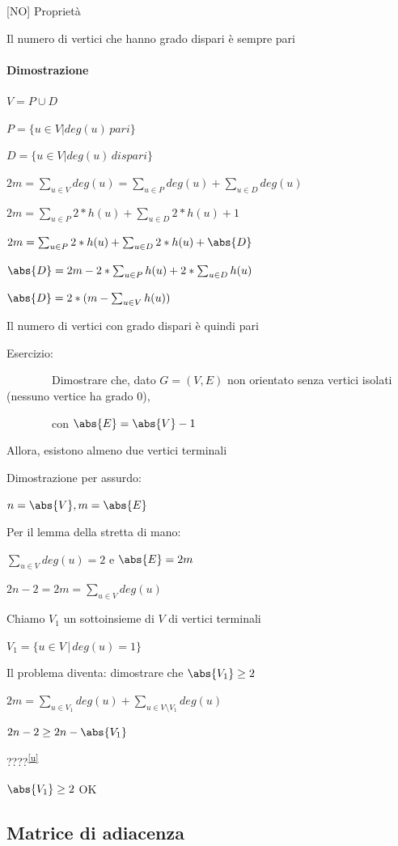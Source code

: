 \documentclass[tikz]{article}
\let\oldparagraph\paragraph
\renewcommand{\paragraph}[1]{\oldparagraph{#1}\mbox{}}
\begin{document}
{{[}NO{]} Proprietà}

{Il numero di vertici che hanno grado dispari è sempre pari}

\paragraph{Dimostrazione}

$V=P\cup D$

$P = \{u \in V | deg(u) \, pari\}$

$D = \{u \in V | deg(u) \, dispari\}$

$2m = \sum_{u \in V}{deg(u)} = \sum_{u \in P}{deg(u)} + \sum_{u \in D}{deg(u)}$

$2m = \sum_{u \in P}{2*h(u)} + \sum_{u \in D}{2*h(u)+1}$

$2m = \sum_{u \in P}{2*h(u)} + \sum_{u \in D}{2*h(u)} + \abs{D}$

$\abs{D} = 2m - 2 *\sum_{u \in P}{h(u)} + 2*\sum_{u \in D}{h(u)}$

$\abs{D} = 2*(m-\sum_{u \in V}{h(u)})$

{Il numero di vertici con grado dispari è quindi pari}

{Esercizio: }

{~~~~~~~~Dimostrare che, dato $G=(V,E)$ non orientato senza vertici isolati (nessuno vertice ha grado 0),}

{~~~~~~~~con $\abs{E} = \abs{V} -1$}

{Allora, esistono almeno due vertici terminali}

{Dimostrazione per assurdo:}

$n=\abs{V},m=\abs{E}$

{Per il lemma della stretta di mano:}

$\sum_{u \in V}{deg(u)} = 2$ e $\abs{E} = 2m$

$2n-2 = 2m = \sum_{u \in V}{deg(u)}$

{Chiamo $V_1$ un sottoinsieme di $V$ di vertici terminali}

$V_1=\{u\in V\,|\,deg(u)=1\}$

{Il problema diventa: dimostrare che $\abs{V_1} \geq 2$}

$2m = \sum_{u \in V_1}{deg(u)} +  \sum_{u \in V \setminus V_1}{deg(u)}$

$2n -2 \geq 2n - \abs{V_1}$

{????}\textsuperscript{\protect\hyperlink{cmnt21}{{[}u{]}}}

{$\abs{V_1} \geq 2$ OK}

\subsection{Matrice di adiacenza}
\end{document}
